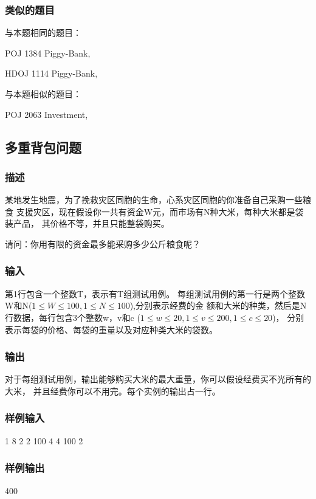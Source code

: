 \subsubsection{类似的题目}
与本题相同的题目：
\begindot
\item POJ 1384 Piggy-Bank, 
\item HDOJ 1114 Piggy-Bank, 
\myenddot

与本题相似的题目：
\begindot
\item POJ 2063 Investment, 
\myenddot

\subsection{多重背包问题}

\subsubsection{描述}
某地发生地震，为了挽救灾区同胞的生命，心系灾区同胞的你准备自己采购一些粮食
支援灾区，现在假设你一共有资金W元，而市场有N种大米，每种大米都是袋装产品，
其价格不等，并且只能整袋购买。

请问：你用有限的资金最多能采购多少公斤粮食呢？

\subsubsection{输入}
第1行包含一个整数T，表示有T组测试用例。
每组测试用例的第一行是两个整数W和N($1 \leq W \leq 100, 1 \leq N \leq 100$),分别表示经费的金
额和大米的种类，然后是N行数据，每行包含3个整数w，v和c
($1 \leq w \leq 20,1 \leq v \leq 200,1 \leq c \leq 20$)，
分别表示每袋的价格、每袋的重量以及对应种类大米的袋数。

\subsubsection{输出}
对于每组测试用例，输出能够购买大米的最大重量，你可以假设经费买不光所有的大米，
并且经费你可以不用完。每个实例的输出占一行。

\subsubsection{样例输入}
\begin{Code}
1
8 2
2 100 4
4 100 2
\end{Code}

\subsubsection{样例输出}
\begin{Code}
400
\end{Code}

